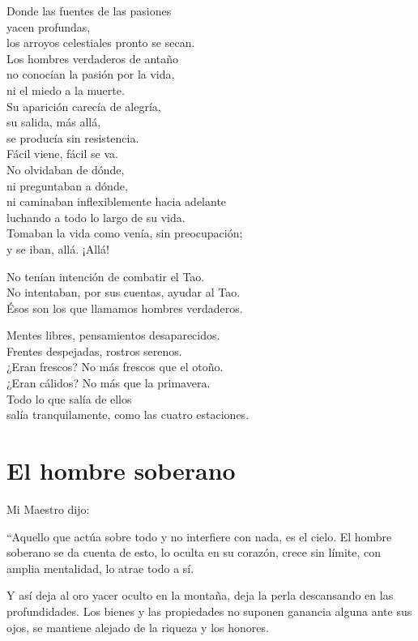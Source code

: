 \documentclass[hidelinks]{memoir}
\begin{document}
	Donde las fuentes de las pasiones\\
	yacen profundas,\\
	los arroyos celestiales pronto se secan.\\
	Los hombres verdaderos de antaño\\
	no conocían la pasión por la vida,\\
	ni el miedo a la muerte.\\
	Su aparición carecía de alegría,\\
	su salida, más allá,\\
	se producía sin resistencia.\\
	Fácil viene, fácil se va.\\
	No olvidaban de dónde,\\
	ni preguntaban a dónde,\\
	ni caminaban inflexiblemente hacia adelante\\
	luchando a todo lo largo de su vida.\\
	Tomaban la vida como venía, sin preocupación;\\
	y se iban, allá. ¡Allá!
	
	No tenían intención de combatir el Tao.\\
	No intentaban, por sus cuentas, ayudar al Tao.\\
	Ésos son los que llamamos hombres verdaderos.
	
	Mentes libres, pensamientos desaparecidos.\\
	Frentes despejadas, rostros serenos.\\
	¿Eran frescos? No más frescos que el otoño.\\
	¿Eran cálidos? No más que la primavera.\\
	Todo lo que salía de ellos\\
	salía tranquilamente, como las cuatro estaciones.
	
	\chapter*{El hombre soberano}
	
	Mi Maestro dijo:
	
	``Aquello que actúa sobre todo y no interfiere con nada, es el cielo. El
	hombre soberano se da cuenta de esto, lo oculta en su corazón, crece sin
	límite, con amplia mentalidad, lo atrae todo a sí.
	
	Y así deja al oro yacer oculto en la montaña, deja la perla descansando
	en las profundidades. Los bienes y las propiedades no suponen ganancia
	alguna ante sus ojos, se mantiene alejado de la riqueza y los honores.
	
\end{document}
